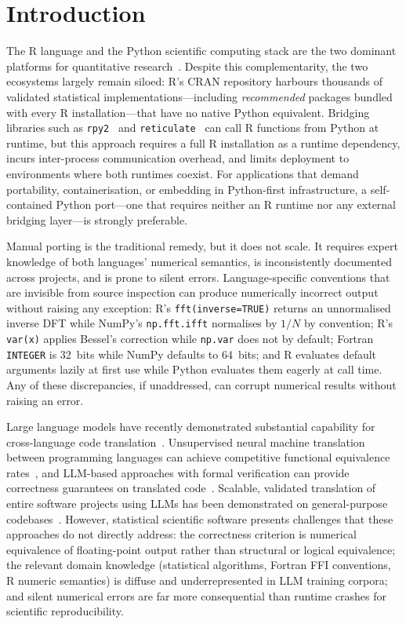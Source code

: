 \documentclass[12pt,a4paper]{article}
\newcommand{\pkg}[1]{\texttt{#1}}
\begin{document}
\section{Introduction}

The R language and the Python scientific computing stack are the two dominant platforms for quantitative research~\cite{oliphant2007,harris2020numpy,virtanen2020scipy}. Despite this complementarity, the two ecosystems largely remain siloed: R's CRAN repository harbours thousands of validated statistical implementations---including \textit{recommended} packages bundled with every R installation---that have no native Python equivalent. Bridging libraries such as \pkg{rpy2}~\cite{gautier2008rpy2} and \pkg{reticulate}~\cite{ushey2023reticulate} can call R functions from Python at runtime, but this approach requires a full R installation as a runtime dependency, incurs inter-process communication overhead, and limits deployment to environments where both runtimes coexist. For applications that demand portability, containerisation, or embedding in Python-first infrastructure, a self-contained Python port---one that requires neither an R runtime nor any external bridging layer---is strongly preferable.

Manual porting is the traditional remedy, but it does not scale. It requires expert knowledge of both languages' numerical semantics, is inconsistently documented across projects, and is prone to silent errors. Language-specific conventions that are invisible from source inspection can produce numerically incorrect output without raising any exception: R's \texttt{fft(inverse=TRUE)} returns an unnormalised inverse DFT while NumPy's \texttt{np.fft.ifft} normalises by $1/N$ by convention; R's \texttt{var(x)} applies Bessel's correction while \texttt{np.var} does not by default; Fortran \texttt{INTEGER} is 32~bits while NumPy defaults to 64~bits; and R evaluates default arguments lazily at first use while Python evaluates them eagerly at call time. Any of these discrepancies, if unaddressed, can corrupt numerical results without raising an error.

Large language models have recently demonstrated substantial capability for cross-language code translation~\cite{chen2021codex,roziere2020transcoder,wang2021codet5}. Unsupervised neural machine translation between programming languages can achieve competitive functional equivalence rates~\cite{roziere2020transcoder}, and LLM-based approaches with formal verification can provide correctness guarantees on translated code~\cite{bhatia2024}. Scalable, validated translation of entire software projects using LLMs has been demonstrated on general-purpose codebases~\cite{zhang2024scalable}. However, statistical scientific software presents challenges that these approaches do not directly address: the correctness criterion is numerical equivalence of floating-point output rather than structural or logical equivalence; the relevant domain knowledge (statistical algorithms, Fortran FFI conventions, R numeric semantics) is diffuse and underrepresented in LLM training corpora; and silent numerical errors are far more consequential than runtime crashes for scientific reproducibility.
\end{document}
